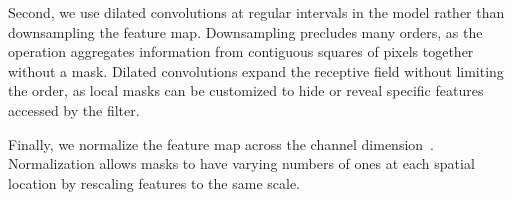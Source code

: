 \documentclass[letterpaper]{article}
\begin{document}
\begin{table}[t]
\caption{Average negative log likelihood of binarized and grayscale MNIST digits under our model. Lower is better.}
\label{table:bpd_mnist}
\begin{center}
\end{center}
\vspace{-2mm}
\end{table} 
Second, we use dilated convolutions \citep{yu2015multi} at regular intervals in the model rather than downsampling the feature map. Downsampling precludes many orders, as the operation aggregates information from contiguous squares of pixels together without a mask. Dilated convolutions expand the receptive field without limiting the order, as local masks can be customized to hide or reveal specific features accessed by the filter.

Finally, we normalize the feature map across the channel dimension~\citep{li2019positional}. Normalization allows masks to have varying numbers of ones at each spatial location by rescaling features to the same scale.
\end{document}
